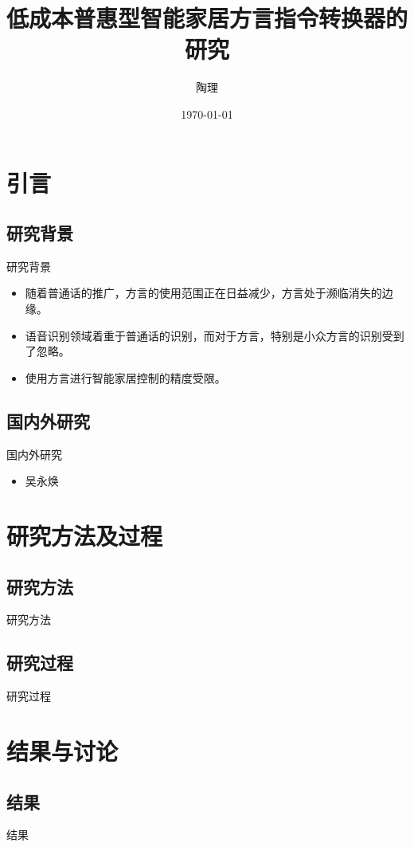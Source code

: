 \documentclass{beamer}
\title{低成本普惠型智能家居方言指令转换器的研究}
\author{陶理}
\date{\today}
\begin{document}
\maketitle
\section{引言}
\subsection{研究背景}
\begin{frame}{研究背景}
    \begin{itemize}
        \item 随着普通话的推广，方言的使用范围正在日益减少，方言处于濒临消失的边缘。
        \item 语音识别领域着重于普通话的识别，而对于方言，特别是小众方言的识别受到了忽略。
        \item 使用方言进行智能家居控制的精度受限。
    \end{itemize}
\end{frame}
\subsection{国内外研究} 
\begin{frame}{国内外研究}
    \begin{itemize}
        \item 吴永焕\cite{WuYonghuan}
    \end{itemize}
\end{frame}
\section{研究方法及过程}
\subsection{研究方法}
\begin{frame}{研究方法}
\end{frame}
\subsection{研究过程}
\begin{frame}{研究过程}
\end{frame}
\section{结果与讨论}
\subsection{结果}
\begin{frame}{结果}
\end{frame}
\end{document}
